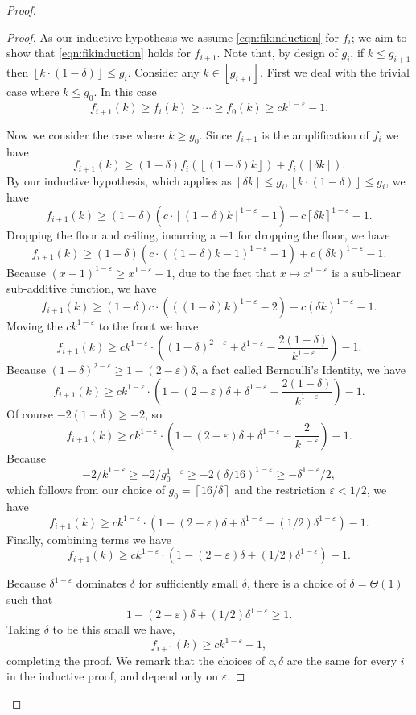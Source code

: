 \documentclass[twocolumn]{article}[10pt]
\newcommand{\floor}[1]{\left\lfloor #1 \right\rfloor}
\newcommand{\ceil}[1]{\left\lceil #1 \right\rceil}
\begin{document}
\begin{proof}
\begin{proof}
  As our inductive hypothesis we assume
  \eqref{eqn:fikinduction} for $f_i$; we aim to show that 
  \eqref{eqn:fikinduction} holds for $f_{i+1}$. Note that, by
  design of $g_i$, if $k \le g_{i+1}$ then $\floor{k\cdot (1-\delta)} \le g_i$.
  Consider any $k\in [g_{i+1}]$. First we deal with the trivial
  case where $k \le g_0$. In this case 
  $$f_{i+1}(k) \ge f_i(k) \ge \cdots \ge f_0(k) \ge ck^{1-\varepsilon} -1.$$

  Now we consider the case where $k \ge g_0$.
  Since $f_{i+1}$ is the amplification of $f_i$ we have
  $$f_{i+1}(k) \ge (1-\delta) f_i(\floor{(1-\delta)k}) + f_i(\ceil{\delta k}).$$
  By our inductive hypothesis, which applies as $\ceil{\delta k}\le g_i, \floor{k\cdot (1-\delta)} \le g_i$, we have
  $$f_{i+1}(k) \ge (1-\delta) (c \cdot\floor{(1-\delta)k}^{1-\varepsilon}-1) + c\ceil{\delta k}^{1-\varepsilon} - 1. $$
  Dropping the floor and ceiling, incurring a $-1$ for dropping the floor, we have
  $$f_{i+1}(k) \ge (1-\delta) (c \cdot ((1-\delta)k-1)^{1-\varepsilon}-1) + c (\delta k)^{1-\varepsilon} - 1.$$
  Because $(x-1)^{1-\varepsilon} \ge x^{1-\varepsilon} -1$, due to the
  fact that $x\mapsto x^{1-\varepsilon}$ is a sub-linear
  sub-additive function, we have 
  $$f_{i+1}(k) \ge (1-\delta) c \cdot (((1-\delta)k)^{1-\varepsilon}-2) + c(\delta k)^{1-\varepsilon}-1.$$
  Moving the $ck^{1-\varepsilon}$ to the front we have
  $$ f_{i+1}(k) \ge ck^{1-\varepsilon} \cdot\left((1-\delta)^{2-\varepsilon} + \delta^{1-\varepsilon} - \frac{2(1-\delta)}{k^{1-\varepsilon}} \right) -1.$$
  Because $(1-\delta)^{2-\varepsilon} \ge 1-(2-\varepsilon)\delta$, a fact called Bernoulli's Identity, we have
  $$f_{i+1}(k) \ge ck^{1-\varepsilon} \cdot\left(1-(2-\varepsilon)\delta + \delta^{1-\varepsilon} - \frac{2(1-\delta)}{k^{1-\varepsilon}} \right)-1.$$
  Of course $-2(1-\delta) \ge -2$, so 
  $$f_{i+1}(k) \ge ck^{1-\varepsilon} \cdot\left(1-(2-\varepsilon)\delta + \delta^{1-\varepsilon} - \frac{2}{k^{1-\varepsilon}} \right) -1.$$
  Because 
  $$-2/k^{1-\varepsilon} \ge -2/g_0^{1-\varepsilon} \ge
  -2(\delta/16)^{1-\varepsilon} \ge -\delta^{1-\varepsilon}/2,$$ which follows from our choice of $g_0 = \ceil{16/\delta}$ and the restriction
  $\varepsilon<1/2$, we have
  $$f_{i+1}(k) \ge ck^{1-\varepsilon} \cdot\left(1-(2-\varepsilon)\delta + \delta^{1-\varepsilon} - (1/2)\delta^{1-\varepsilon} \right)-1.$$
  Finally, combining terms we have
  $$f_{i+1}(k) \ge  ck^{1-\varepsilon} \cdot\left(1-(2-\varepsilon)\delta + (1/2)\delta^{1-\varepsilon}\right)-1. $$

  Because $\delta^{1-\varepsilon}$ dominates $\delta$ for
  sufficiently small $\delta$, there is a choice of
  $\delta=\Theta(1)$ such that 
  $$1-(2-\varepsilon)\delta + (1/2)\delta^{1-\varepsilon} \ge 1.$$ 
  Taking $\delta$ to be this
  small we have,
  $$f_{i+1}(k) \ge ck^{1-\varepsilon}-1,$$
  completing the proof. We remark that the choices of $c, \delta$
  are the same for every $i$ in the inductive proof, and depend
  only on $\varepsilon$. 
  \end{proof}


\end{proof}
\end{document}
